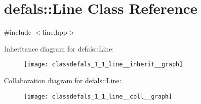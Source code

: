 \hypertarget{classdefals_1_1_line}{}\section{defals\+:\+:Line Class Reference}
\label{classdefals_1_1_line}


{\ttfamily \#include $<$line.\+hpp$>$}



Inheritance diagram for defals\+:\+:Line\+:\nopagebreak
\begin{figure}[H]
\begin{center}
\leavevmode
\texttt{[image: classdefals\_1\_1\_line\_\_inherit\_\_graph]}
\end{center}
\end{figure}


Collaboration diagram for defals\+:\+:Line\+:\nopagebreak
\begin{figure}[H]
\begin{center}
\leavevmode
\texttt{[image: classdefals\_1\_1\_line\_\_coll\_\_graph]}
\end{center}
\end{figure}
